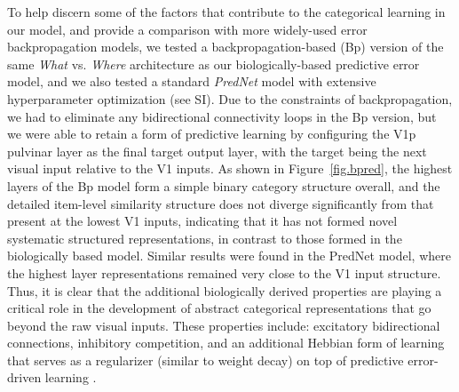 \documentclass[11pt,twoside]{article}
\newif\myifpdf
\begin{document}
To help discern some of the factors that contribute to the categorical learning in our model, and provide a comparison with more widely-used error backpropagation models, we tested a backpropagation-based (Bp) version of the same \emph{What} vs. \emph{Where} architecture as our biologically-based predictive error model, and we also tested a standard \emph{PredNet} model \cite{LotterKreimanCox16} with extensive hyperparameter optimization (see SI).  Due to the constraints of backpropagation, we had to eliminate any bidirectional connectivity loops in the Bp version, but we were able to retain a form of predictive learning by configuring the V1p pulvinar layer as the final target output layer, with the target being the next visual input relative to the V1 inputs.  As shown in Figure~\ref{fig.bpred}, the highest layers of the Bp model form a simple binary category structure overall, and the detailed item-level similarity structure does not diverge significantly from that present at the lowest V1 inputs, indicating that it has not formed novel systematic structured representations, in contrast to those formed in the biologically based model.  Similar results were found in the PredNet model, where the highest layer representations remained very close to the V1 input structure.  Thus, it is clear that the additional biologically derived properties are playing a critical role in the development of abstract categorical representations that go beyond the raw visual inputs. These properties include: excitatory bidirectional connections, inhibitory competition, and an additional Hebbian form of learning that serves as a regularizer (similar to weight decay) on top of predictive error-driven learning \cite{OReilly98,OReillyMunakata00}.
\end{document}
